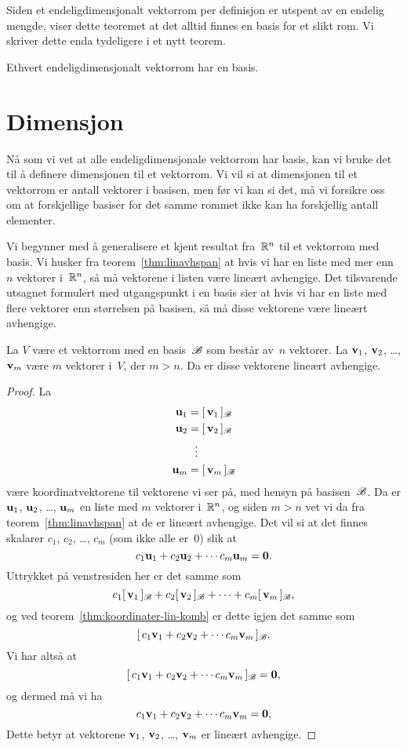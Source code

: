 Siden et endeligdimensjonalt vektorrom per definisjon er utspent av en
endelig mengde, viser dette teoremet at det alltid finnes en basis for
et slikt rom.  Vi skriver dette enda tydeligere i et nytt teorem.

\begin{thm}
Ethvert endeligdimensjonalt vektorrom har en basis.
\end{thm}



\section*{Dimensjon}

Nå som vi vet at alle endeligdimensjonale vektorrom har basis, kan vi
bruke det til å definere dimensjonen til et vektorrom.  Vi vil si at
dimensjonen til et vektorrom er antall vektorer i basisen, men før vi
kan si det, må vi forsikre oss om at forskjellige basiser for det
samme rommet ikke kan ha forskjellig antall elementer.

Vi begynner med å generalisere et kjent resultat fra~$\mathbb{R}^n$ til et
vektorrom med basis.  Vi husker fra teorem~\ref{thm:linavhspan} at
hvis vi har en liste med mer enn~$n$ vektorer i~$\mathbb{R}^n$, så må
vektorene i listen være lineært avhengige.  Det tilsvarende utsagnet
formulert med utgangspunkt i en basis sier at hvis vi har en liste med
flere vektorer enn størrelsen på basisen, så må disse vektorene være
lineært avhengige.

\begin{thm}
\label{thm:flere-vektorer-enn-str-basis}
La $V$ være et vektorrom med en basis~$\mathscr{B}$ som består av~$n$ vektorer.
La $\mathbf{v}_1$, $\mathbf{v}_2$, \ldots, $\mathbf{v}_m$ være $m$ vektorer i~$V$, der $m > n$.
Da er disse vektorene lineært avhengige.
\end{thm}
\begin{proof}
La
\begin{align*}
\mathbf{u}_1 &= [\,{\mathbf{v}_1}\,]_{\mathscr{B}} \\
\mathbf{u}_2 &= [\,{\mathbf{v}_2}\,]_{\mathscr{B}} \\
     &\ \ \vdots \\
\mathbf{u}_m &= [\,{\mathbf{v}_m}\,]_{\mathscr{B}}
\end{align*}
være koordinatvektorene til vektorene vi ser på, med hensyn på
basisen~$\mathscr{B}$.  Da er $\mathbf{u}_1$, $\mathbf{u}_2$, \ldots, $\mathbf{u}_m$ en liste med $m$
vektorer i~$\mathbb{R}^n$, og siden $m > n$ vet vi da fra
teorem~\ref{thm:linavhspan} at de er lineært avhengige.  Det vil si at
det finnes skalarer $c_1$, $c_2$, \ldots, $c_m$ (som ikke alle er~$0$)
slik at
\[
c_1 \mathbf{u}_1 + c_2 \mathbf{u}_2 + \cdots c_m \mathbf{u}_m = \mathbf{0}.
\]
Uttrykket på venstresiden her er det samme som
\[
c_1 [\,{\mathbf{v}_1}\,]_{\mathscr{B}} + c_2 [\,{\mathbf{v}_2}\,]_{\mathscr{B}} + \cdots + c_m [\,{\mathbf{v}_m}\,]_{\mathscr{B}},
\]
og ved teorem~\ref{thm:koordinater-lin-komb} er dette igjen det samme
som
\[
[\,{c_1 \mathbf{v}_1 + c_2 \mathbf{v}_2 + \cdots c_m \mathbf{v}_m}\,]_{\mathscr{B}}.
\]
Vi har altså at
\[
[\,{c_1 \mathbf{v}_1 + c_2 \mathbf{v}_2 + \cdots c_m \mathbf{v}_m}\,]_{\mathscr{B}} = \mathbf{0},
\]
og dermed må vi ha
\[
c_1 \mathbf{v}_1 + c_2 \mathbf{v}_2 + \cdots c_m \mathbf{v}_m = \mathbf{0},
\]
Dette betyr at vektorene $\mathbf{v}_1$, $\mathbf{v}_2$, \ldots, $\mathbf{v}_m$ er lineært
avhengige.
\end{proof}


